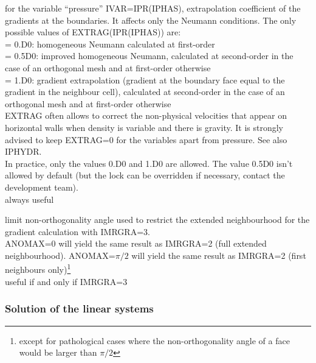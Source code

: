 {for the variable ``pressure'' IVAR=IPR(IPHAS), extrapolation coefficient
of the gradients at the boundaries. It affects only the Neumann conditions.
The only possible values of EXTRAG(IPR(IPHAS)) are:\\
\hspace*{1.3cm}= 0.D0: homogeneous Neumann calculated at first-order\\
\hspace*{1.3cm}= 0.5D0: improved homogeneous Neumann, calculated at
second-order in the case of an orthogonal mesh and at first-order otherwise\\
\hspace*{1.3cm}= 1.D0: gradient extrapolation (gradient at the boundary face
equal to the gradient in the neighbour cell), calculated at
second-order in the case of an orthogonal mesh and at first-order otherwise\\
EXTRAG often allows to correct the non-physical velocities that
appear on horizontal walls when density is variable and there is gravity.
It is strongly advised to keep EXTRAG=0 for the variables apart from
pressure. See also IPHYDR.\\  
In practice, only the values 0.D0 and 1.D0 are allowed. The 
value 0.5D0 isn't allowed by default (but the lock can be overridden if
necessary, contact the development team).\\
always useful}

{limit non-orthogonality angle used to restrict the extended neighbourhood for
the gradient calculation with IMRGRA=3.\\
ANOMAX=0 will yield the same result as IMRGRA=2 (full extended
neighbourhood). ANOMAX=$\pi/2$ will yield the same result as IMRGRA=2 (first
neighbours only)\footnote{except for pathological cases where the
non-orthogonality angle of a face would be larger than $\pi/2$}\\
useful if and only if IMRGRA=3}

\subsubsection{Solution of the linear systems}

